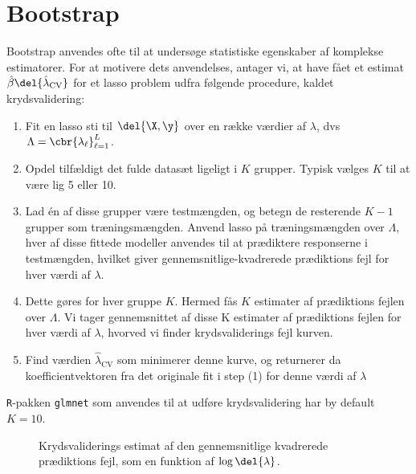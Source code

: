 \section{Bootstrap}
Bootstrap anvendes ofte til at undersøge statistiske egenskaber af komplekse estimatorer.
For at motivere dets anvendelses, antager vi, at have fået et estimat \(\hat{\beta} \del{\hat{\lambda}_{\text{CV}}}\) for et lasso problem udfra følgende procedure, kaldet krydsvalidering:
%
\begin{enumerate}
\item Fit en lasso sti til \(\del{\X, \y}\) over en række værdier af \(\lambda\), dvs \(\Lambda = \cbr{\lambda_\ell}_{\ell=1}^L\).
\item Opdel tilfældigt det fulde datasæt ligeligt i \(K\) grupper. Typisk vælges \(K\) til at være lig 5 eller 10.
\item Lad én af disse grupper være testmængden, og betegn de resterende \(K-1\) grupper som træningsmængden. 
Anvend lasso på træningsmængden over \(\Lambda\), hver af disse fittede modeller anvendes til at prædiktere responserne i testmængden, hvilket giver gennemsnitlige-kvadrerede prædiktions fejl for hver værdi af \(\lambda\). 
\item Dette gøres for hver gruppe \(K\). Hermed fås \(K\) estimater af prædiktions fejlen over \(\Lambda\). 
Vi tager gennemsnittet af disse K estimater af prædiktions fejlen for hver værdi af \(\lambda\), hvorved vi finder krydsvaliderings fejl kurven.
\item Find værdien \(\hat{\lambda}_{\text{CV}}\) som minimerer denne kurve, og returnerer da koefficientvektoren fra det originale fit i step (1) for denne værdi af $\lambda$
\end{enumerate}
\texttt{R}-pakken \texttt{glmnet} som anvendes til at udføre krydsvalidering har by default \(K=10\).
%
\begin{figure}[H]
\centering
\caption{Krydsvaliderings estimat af den gennemsnitlige kvadrerede prædiktions fejl, som en funktion af \(\log \del{\lambda}\).}
\label{fig:CV_error_crime}
\end{figure}
